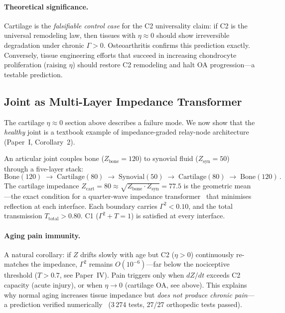\documentclass[aps,pre,twocolumn,superscriptaddress,floatfix]{revtex4-2}
\begin{document}
\paragraph{Theoretical significance.}
Cartilage is the \emph{falsifiable control case}
for the C2 universality claim:
if C2 is the universal remodeling law, then
tissues with $\eta \approx 0$ should show
irreversible degradation under chronic
$\Gamma > 0$.  Osteoarthritis confirms this
prediction exactly.
Conversely, tissue engineering efforts that
succeed in increasing chondrocyte proliferation
(raising $\eta$) should restore C2 remodeling
and halt OA progression---a testable prediction.

\subsection{Joint as Multi-Layer Impedance Transformer}
\label{sec:joint-transformer}

The cartilage $\eta \approx 0$ section above describes
a failure mode.  We now show that the \emph{healthy}
joint is a textbook example of impedance-graded
relay-node architecture (Paper~I, Corollary~2).

An articular joint couples bone ($Z_{\text{bone}} = 120$)
to synovial fluid ($Z_{\text{syn}} = 50$) through a
five-layer stack:
\[
  \text{Bone}(120) \;\to\; \text{Cartilage}(80)
  \;\to\; \text{Synovial}(50)
  \;\to\; \text{Cartilage}(80)
  \;\to\; \text{Bone}(120)\,.
\]
The cartilage impedance $Z_{\text{cart}} = 80 \approx
\sqrt{Z_{\text{bone}} \cdot Z_{\text{syn}}} = 77.5$
is the geometric mean---the exact condition for a
quarter-wave impedance transformer~\cite{Pozar2011}
that minimises reflection at each interface.
Each boundary carries $\Gamma^2 < 0.10$, and
the total transmission $T_{\text{total}} > 0.80$.
C1 ($\Gamma^2 + T = 1$) is satisfied at every interface.

\paragraph{Aging pain immunity.}
A natural corollary: if $Z$ drifts slowly with age
but C2 ($\eta > 0$) continuously re-matches the
impedance, $\Gamma^2$ remains $O(10^{-6})$---far below
the nociceptive threshold ($T > 0.7$, see Paper~IV).
Pain triggers only when $dZ/dt$ exceeds C2 capacity
(acute injury), or when $\eta \to 0$
(cartilage OA, see above).
This explains why normal aging increases tissue
impedance but \emph{does not produce chronic pain}---a
prediction verified numerically~\cite{ALICE_code}
(3\,274 tests, 27/27 orthopedic tests passed).
\end{document}
